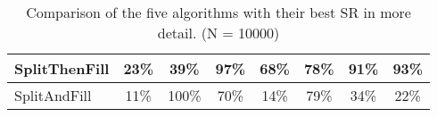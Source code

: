 \begin{table}[h]
\begin{tabular}{|l|c|c|c|c|c|c|c|}
		SplitThenFill                   &23\%    &39\%                                                           &97\%                                                              &68\%      &78\%                                                        &91\%                                                         &93\%                                                           \\ \hline
		SplitAndFill                    &11\%      &100\%                                                           &70\%                                                              &14\%      &79\%                                                        &34\%                                                         &22\%                                                           \\ \hline
	\end{tabular}
	\caption{Comparison of the five algorithms with their best SR in more detail. (N = 10000)}
	\label{comparisionsAlgorithms}
\end{table}

\clearpage
\pagebreak
